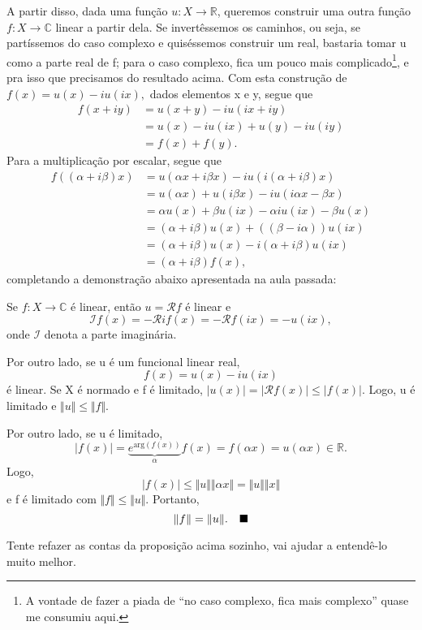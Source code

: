 \documentclass[../functional_analysis.tex]{subfiles}
\begin{document}
A partir disso, dada uma função \(u:X\rightarrow \mathbb{R}\), queremos construir uma outra função \(f:X\rightarrow \mathbb{C}\) linear a partir dela. Se invertêssemos os caminhos, ou seja, se partíssemos do caso complexo e quiséssemos construir um real, bastaria tomar u como a parte real de f; para o caso complexo, fica um pouco mais complicado\footnote{A vontade de fazer a piada de ``no caso complexo, fica mais complexo'' quase me consumiu aqui.}, e pra isso que precisamos do resultado acima. Com esta construção de \(f(x) = u(x) - iu(ix),\) dados elementos x e y, segue que
\begin{align*}
	f(x+iy) & = u(x+y) - iu(ix+iy)          \\
	        & = u(x) - iu(ix) + u(y)-iu(iy) \\
	        & = f(x) + f(y).
\end{align*}
Para a multiplicação por escalar, segue que
\begin{align*}
	f((\alpha +i\beta )x) & = u(\alpha x + i\beta x) - i u(i(\alpha +i\beta )x)       \\
	                      & = u(\alpha x)+u(i\beta x) - i u(i\alpha x - \beta x)      \\
	                      & = \alpha u(x) + \beta u(ix) - \alpha i u(ix) - \beta u(x) \\
	                      & = (\alpha +i\beta)u(x) + ((\beta - i \alpha ))u(ix)       \\
	                      & = (\alpha + i\beta )u(x) - i(\alpha +i\beta )u(ix)        \\
	                      & = (\alpha +i\beta )f(x),
\end{align*}
completando a demonstração abaixo apresentada na aula passada:

\begin{proof*}
	Se \(f:X\rightarrow \mathbb{C}\) é linear, então \(u=\mathcal{R}f\) é linear e
	\[
		\mathcal{I}f(x)=-\mathcal{R}if(x)=-\mathcal{R}f(ix)=-u(ix),
	\]
	onde \(\mathcal{I}\) denota a parte imaginária.

	Por outro lado, se u é um funcional linear real,
	\[
		f(x)=u(x)-iu(ix)
	\]
	é linear. Se X é normado e f é limitado, \(|u(x)|=|\mathcal{R}f(x)|\leq |f(x)|.\) Logo, u é limitado e \(\Vert u \Vert\leq \Vert f \Vert.\)

	Por outro lado, se u é limitado,
	\[
		|f(x)|=\underbrace{e^{\mathrm{arg}(f(x))}}_{\alpha }f(x)=f(\alpha x)=u(\alpha x)\in \mathbb{R}.
	\]
	Logo,
	\[
		|f(x)|\leq \Vert u \Vert \Vert \alpha x \Vert = \Vert u \Vert \Vert x \Vert
	\]
	e f é limitado com \(\Vert f \Vert\leq \Vert u \Vert.\) Portanto,
	\[
		\Vert f \Vert=\Vert u \Vert.\quad \text{$\blacksquare$}
	\]
\end{proof*}
\begin{exr}
	Tente refazer as contas da proposição acima sozinho, vai ajudar a entendê-lo muito melhor.
\end{exr}
\end{document}
